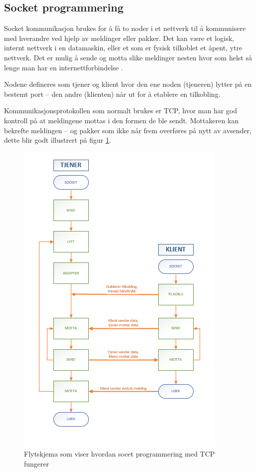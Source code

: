 \documentclass[conference]{IEEEtran}
\begin{document}
    \subsection{Socket programmering}
        Socket kommunikasjon brukes for å få to noder i et nettverk til å kommunisere med hverandre ved hjelp av meldinger eller pakker. Det kan være et logisk, internt nettverk i en datamaskin, eller et som er fysisk tilkoblet et åpent, ytre nettverk. Det er mulig å sende og motta slike meldinger nesten hvor som helst så lenge man har en internettforbindelse \cite{teori:socket}.

        Nodene defineres som tjener og klient hvor den ene noden (tjeneren) lytter på en bestemt port – den andre (klienten) når ut for å etablere en tilkobling.

        Kommunikasjonsprotokollen som normalt brukes er TCP, hvor man har god kontroll på at meldingene mottas i den formen de ble sendt. Mottakeren 
        kan bekrefte meldingen – og pakker som ikke når frem overføres på nytt av avsender, dette blir godt illustrert på figur \ref{fig:socket}.
        \begin{figure}
            \centering
            \includegraphics[width=.8\linewidth]{images/socket_flytskjema.png}
            \caption{Flytskjema som viser hvordan socet programmering med TCP fungerer}
            \label{fig:socket}
        \end{figure}
\end{document}
